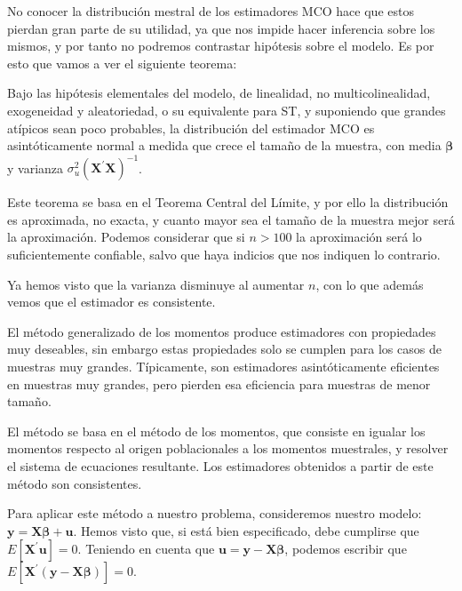 No conocer la distribuci\'on mestral de los estimadores MCO hace que estos pierdan gran parte de su utilidad, ya que nos impide hacer inferencia sobre los mismos, y por tanto no podremos contrastar hip\'otesis sobre el modelo. Es por esto que vamos a ver el siguiente teorema:

\begin{teorema}
Bajo las hip\'otesis elementales del modelo, de linealidad, no multicolinealidad, exogeneidad y aleatoriedad, o su equivalente para ST, y suponiendo que grandes at\'ipicos sean poco probables, la distribuci\'on del estimador MCO es asint\'oticamente normal a medida que crece el tama\~no de la muestra, con media $\boldsymbol{\beta}$ y varianza $\sigma_{u}^{2}\left(\boldsymbol{X}^{\prime}\boldsymbol{X}\right)^{-1}$.
\end{teorema}

Este teorema se basa en el Teorema Central del L\'imite, y por ello la distribuci\'on es aproximada, no exacta, y cuanto mayor sea el tama\~no de la muestra mejor ser\'a la aproximaci\'on. Podemos considerar que si $n>100$ la aproximaci\'on ser\'a lo suficientemente confiable, salvo que haya indicios que nos indiquen lo contrario.

Ya hemos visto que la varianza disminuye al aumentar $n$, con lo que adem\'as vemos que el estimador es consistente.



El m\'etodo generalizado de los momentos produce estimadores con propiedades muy deseables, sin embargo estas propiedades solo se cumplen para los casos de muestras muy grandes. T\'ipicamente, son estimadores asint\'oticamente eficientes en muestras muy grandes, pero pierden esa eficiencia para muestras de menor tama\~no.

El m\'etodo se basa en el m\'etodo de los momentos, que consiste en igualar los momentos respecto al origen poblacionales a los momentos muestrales, y resolver el sistema de ecuaciones resultante. Los estimadores obtenidos a partir de este m\'etodo son consistentes.

Para aplicar este m\'etodo a nuestro problema, consideremos nuestro modelo: $\boldsymbol{y}=\boldsymbol{X\beta}+\boldsymbol{u}$. Hemos visto que, si est\'a bien especificado, debe cumplirse que $E\left[\boldsymbol{X}^{\prime}\boldsymbol{u}\right]=0$. Teniendo en cuenta que $\boldsymbol{u}=\boldsymbol{y}-\boldsymbol{X\beta}$, podemos escribir que $E\left[\boldsymbol{X}^{\prime}(\boldsymbol{y}-\boldsymbol{X\beta})\right]=0$.

